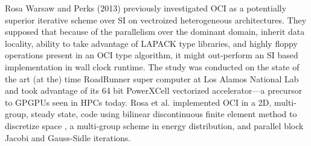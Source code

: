 Rosa Warsaw and Perks (2013) \cite{rosa_cellwise_2013} previously investigated OCI as a potentially superior iterative scheme over SI on vectroized heterogeneous architectures.
They supposed that because of the parallelism over the dominant domain, inherit data locality, ability to take advantage of LAPACK type libraries, and highly floppy operations present in an OCI type algorithm, it might out-perform an SI based implementation in wall clock runtime.
The study was conducted on the state of the art (at the) time RoadRunner super computer at Los Alamos National Lab and took advantage of its 64 bit PowerXCell vectorized accelerator---a precursor to GPGPUs seen in HPCs today.
Rosa et al. implemented OCI in a 2D, multi-group, steady state, code using bilinear discontinuous finite element method to discretize space \cite{tsa_2d2007rosa}, a multi-group scheme in energy distribution, and parallel block Jacobi and Gauss-Sidle iterations.

